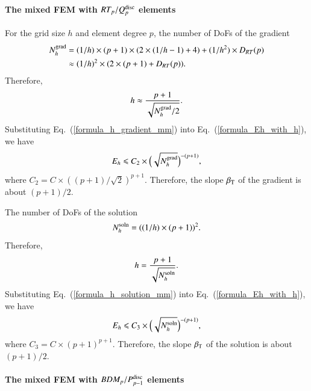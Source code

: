 \documentclass[review,3p]{elsarticle}
\begin{document}
\paragraph{The mixed FEM with \texorpdfstring{$RT_p/Q_p^{\rm disc}$}{RT_p/Q_p{disc}} elements}
For the grid size $h$ and element degree $p$, the number of DoFs of the gradient
\begin{equation}
\begin{aligned}
N_h^{\rm grad} &= (1/h) \times (p+1) \times (2 \times (1/h-1) + 4) + (1/h^2) \times D_{RT}(p) \\
			   &\approx (1/h)^2 \times (2 \times (p+1) + D_{RT}(p)).
\end{aligned}					\label{formula_Nh_gradient_mm}
\end{equation}					
Therefore,
\begin{equation}
h \approx \frac{p+1}{\sqrt{N_h^{\rm grad}/2}}.		\label{formula_h_gradient_mm}
\end{equation}
Substituting Eq.~(\ref{formula_h_gradient_mm}) into Eq.~(\ref{formula_Eh_with_h}), we have
\begin{equation}
E_h \leqslant C_2 \times \Big(\sqrt{N_h^{\rm grad}}\Big)^{-(p+1)},			\label{formula_Eh_with_Nh_gradient_mm}
\end{equation}
where $C_2=C \times ((p+1)/\sqrt{2})^{p+1}$. Therefore, the slope $\beta_{\rm T}$ of the gradient is about $(p+1)/2$.

The number of DoFs of the solution
\begin{equation}
N_h^{\rm soln} = ((1/h) \times (p+1))^2.			\label{formula_Nh_solution_mm}
\end{equation}
Therefore, 
\begin{equation}
h = \frac{p+1}{\sqrt{N_h^{\rm soln}}}.		\label{formula_h_solution_mm}
\end{equation}
Substituting Eq.~(\ref{formula_h_solution_mm}) into Eq.~(\ref{formula_Eh_with_h}), we have
\begin{equation}
E_h \leqslant C_3 \times \Big(\sqrt{N_h^{\rm soln}}\Big)^{-(p+1)},			\label{formula_Eh_with_Nh_solution_mm}
\end{equation}
where $C_3=C \times (p+1)^{p+1}$. Therefore, the slope $\beta_{\rm T}$ of the solution is about $(p+1)/2$.

\paragraph{The mixed FEM with \texorpdfstring{$BDM_p/P_{p-1}^{\rm disc}$}{BDM_p/Q_p-1{disc}} elements}
\end{document}
